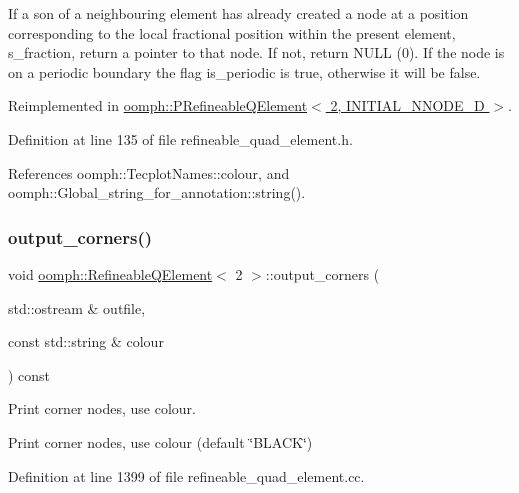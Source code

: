 If a son of a neighbouring element has already created a node at a position corresponding to the local fractional position within the present element, s\+\_\+fraction, return a pointer to that node. If not, return N\+U\+LL (0). If the node is on a periodic boundary the flag is\+\_\+periodic is true, otherwise it will be false. 



Reimplemented in \hyperlink{classoomph_1_1PRefineableQElement_3_012_00_01INITIAL__NNODE__1D_01_4_abe1f777a74c6996aaa3cfbdb2dee1c72}{oomph\+::\+P\+Refineable\+Q\+Element$<$ 2, I\+N\+I\+T\+I\+A\+L\+\_\+\+N\+N\+O\+D\+E\+\_\+D $>$}.



Definition at line 135 of file refineable\+\_\+quad\+\_\+element.\+h.



References oomph\+::\+Tecplot\+Names\+::colour, and oomph\+::\+Global\+\_\+string\+\_\+for\+\_\+annotation\+::string().

\mbox{\label{classoomph_1_1RefineableQElement_3_012_01_4_ac14c3c0281921b093497b76f0f51064a}} 
\subsubsection{\texorpdfstring{output\+\_\+corners()}{output\_corners()}}
{\footnotesize\ttfamily void \hyperlink{classoomph_1_1RefineableQElement}{oomph\+::\+Refineable\+Q\+Element}$<$ 2 $>$\+::output\+\_\+corners (\begin{DoxyParamCaption}\item[{std\+::ostream \&}]{outfile,  }\item[{const std\+::string \&}]{colour }\end{DoxyParamCaption}) const}



Print corner nodes, use colour. 

Print corner nodes, use colour (default \char`\"{}\+B\+L\+A\+C\+K\char`\"{}) 

Definition at line 1399 of file refineable\+\_\+quad\+\_\+element.\+cc.



